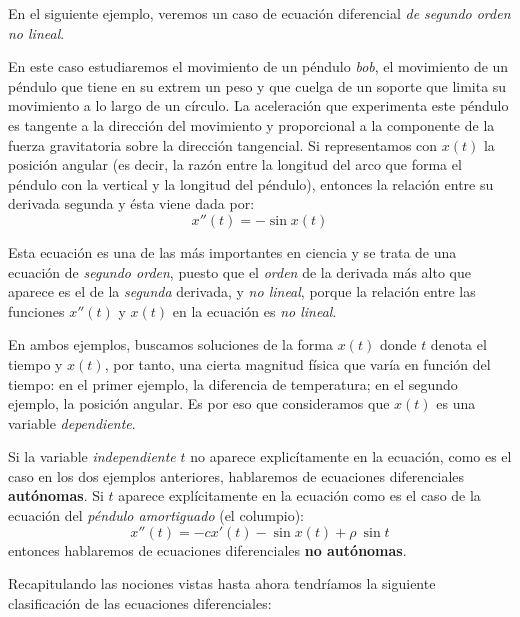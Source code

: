 En el siguiente ejemplo, veremos un caso de ecuación diferencial \emph{de segundo orden} \emph{no lineal}.

\begin{example}[Péndulo]
En este caso estudiaremos el movimiento de un péndulo \emph{bob}, el movimiento de un péndulo que tiene en su extrem un peso y que cuelga de un soporte que limita su movimiento a lo largo de un círculo. La aceleración que experimenta este péndulo es tangente a la dirección del movimiento y proporcional a la componente de la fuerza gravitatoria sobre la dirección tangencial. Si representamos con $x(t)$ la posición angular (es decir, la razón entre la longitud del arco que forma el péndulo con la vertical y la longitud del péndulo), entonces la relación entre su derivada segunda y ésta viene dada por:
\begin{equation}
x''(t) = -\sin x(t)
\end{equation}

Esta ecuación es una de las más importantes en ciencia y se trata de una ecuación de \emph{segundo orden}, puesto que el \emph{orden} de la derivada más alto que aparece es el de la \emph{segunda} derivada, y \emph \emph{no lineal}, porque la relación entre las funciones $x''(t)$ y $x(t)$ en la ecuación es \emph{no lineal}.
\end{example}


En ambos ejemplos, buscamos soluciones de la forma $x(t)$ donde $t$ denota el tiempo y $x(t)$, por tanto, una cierta magnitud física que varía en función del tiempo: en el primer ejemplo, la diferencia de temperatura; en el segundo ejemplo, la posición angular. Es por eso que consideramos que $x(t)$ es una variable \emph{dependiente}.


\begin{definition}
Si la variable \emph{independiente} $t$ no aparece explicítamente en la ecuación, como es el caso en los dos ejemplos anteriores, hablaremos de ecuaciones diferenciales \textbf{autónomas}. Si $t$ aparece explícitamente en la ecuación como es el caso de la ecuación del \emph{péndulo amortiguado} (el columpio):
\begin{equation}
x''(t) = -cx'(t)-\sin x(t)+\rho~\sin t
\end{equation}
entonces hablaremos de ecuaciones diferenciales \textbf{no autónomas}.
\end{definition}

Recapitulando las nociones vistas hasta ahora tendríamos la siguiente clasificación de las ecuaciones diferenciales:

